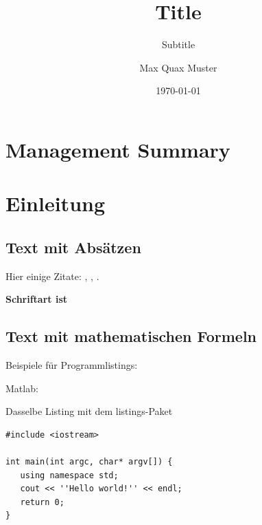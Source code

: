\documentclass[
  10pt, %
  a4paper, %
  twoside, %
  openright, %
  numbers=noenddot, %
  BCOR=5mm, %
  parskip=half*, %
  thesis, %
]{bfhbook}
\author{Max Quax Muster}
\title{Title}
\subtitle{Subtitle}
\date{\today} %
\begin{document}
\maketitle
\frontmatter %
\allowdisplaybreaks

\tableofcontents
\sloppy
\mainmatter %
\chapter*{Management Summary}
\chapter{Einleitung}
\section{Text mit Absätzen}
Hier einige Zitate: \cite{Einstein1923}, \cite{NS87a}, \cite{SH96}.

{\Large \textbf{Schriftart ist \testfont}}

\Blindtext
\section{Text mit mathematischen Formeln}
\blindmathpaper

Beispiele für Programmlistings:

Matlab:


Dasselbe Listing mit dem listings-Paket
\lstset{language=C}
\begin{lstlisting}
#include <iostream>

int main(int argc, char* argv[]) {
   using namespace std;
   cout << ''Hello world!'' << endl;
   return 0;
}
\end{lstlisting}

\blindtext
\end{document}

